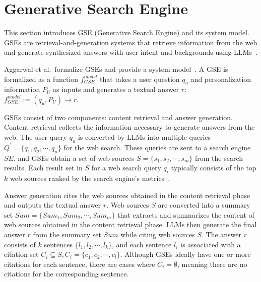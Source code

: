 \section{Generative Search Engine}
\label{sec:generative_search_engine}
This section introduces GSE (Generative Search Engine) and its system model.
GSEs are retrieval-and-generation systems that retrieve information from the web and generate synthesized answers with user intent and backgrounds using LLMs~\cite{geo-apmr+24}.

Aggarwal et al.\ formalize GSEs and provide a system model~\cite{geo-apmr+24}.
A GSE is formalized as a function \( f_{GSE}^{model} \) that takes a user question \( q_u \) and personalization information \( P_U \) as inputs and generates a textual answer \( r \):
$f_{GSE}^{model} := (q_u, P_U) \rightarrow r$.

GSEs consist of two components: content retrieval and answer generation.
Content retrieval collects the information necessary to generate answers from the web.
The user query \( q_u \) is converted by LLMs into multiple queries \( Q^{\prime} = \{q_1, q_2, \cdots, q_n\} \) for the web search.
These queries are sent to a search engine \( SE \), and GSEs obtain a set of web sources \( S = \{s_1, s_2, \cdots, s_m\} \) from the search results.
Each result set in $S$ for a web search query \( q_i \) typically consists of the top \( k \) web sources ranked by the search engine's metrics~\cite{poisonedrag-arxiv24, modern-information-retrieval-a-brief-overview-3320, geo-apmr+24}.

Answer generation cites the web sources obtained in the content retrieval phase and outputs the textual answer \( r \).
Web sources \( S \) are converted into a summary set \( Sum = \{Sum_1, Sum_2, \cdots, Sum_m\} \) that extracts and summarizes the content of web sources obtained in the content retrieval phase.
LLMs then generate the final answer \( r \) from the summary set \( Sum \) while citing web sources \( S \).
The answer \( r \) consists of \( k \) sentences \( \{l_1, l_2, \cdots, l_k\} \), and each sentence \( l_i \) is associated with a citation set \( C_i \subseteq S, C_i = \{c_1, c_2, \cdots, c_l\} \).
Although GSEs ideally have one or more citations for each sentence, there are cases where \( C_i = \emptyset \), meaning there are no citations for the corresponding sentence.


